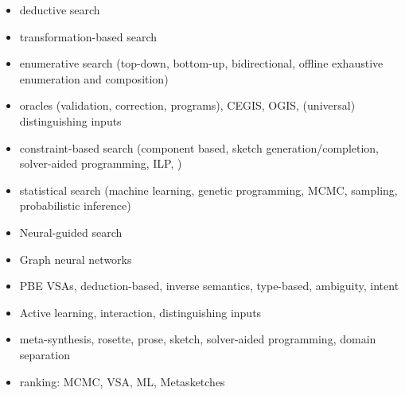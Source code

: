 \begin{itemize}
\item deductive search
\item transformation-based search
\item enumerative search (top-down, bottom-up, bidirectional, offline exhaustive enumeration and composition)
\item oracles (validation, correction, programs), CEGIS, OGIS, (universal) distinguishing inputs
\item constraint-based search (component based, sketch generation/completion, solver-aided programming, ILP, )
\item statistical search (machine learning, genetic programming, MCMC, sampling, probabilistic inference)
\item Neural-guided search
\item Graph neural networks
\item PBE VSAs, deduction-based, inverse semantics, type-based, ambiguity, intent
\item Active learning, interaction, distinguishing inputs
\item meta-synthesis, rosette, prose, sketch, solver-aided programming, domain separation
\item ranking: MCMC, VSA, ML, Metasketches
\end{itemize}


